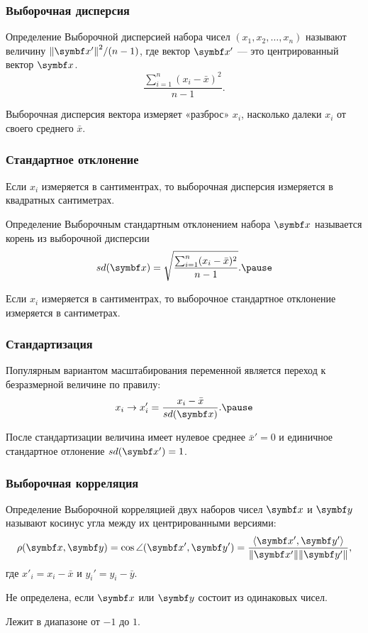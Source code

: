 \begin{frame}
  \frametitle{Выборочная дисперсия}

  \begin{block}{Определение}
    \alert{Выборочной дисперсией} набора чисел $(x_1, x_2, \ldots, x_n)$ 
    называют величину $\norm{\bx'}^2 / (n-1)$, где вектор $\bx'$ — это 
    центрированный вектор $\bx$. 
    \[
    \frac{\sum_{i=1}^n(x_i - \bar x)^2}{n-1}.  
    \]
    \pause
  \end{block}

  Выборочная дисперсия вектора измеряет «разброс» $x_i$, 
  насколько далеки $x_i$ от своего среднего $\bar x$.
  

\end{frame}


\begin{frame}
  \frametitle{Стандартное отклонение}

  Если $x_i$ измеряется в сантиментрах, 
  то выборочная дисперсия измеряется в квадратных сантиметрах. \pause

  \begin{block}{Определение}
    \alert{Выборочным стандартным отклонением} набора $\bx$ называется 
    корень из выборочной дисперсии 
    \[
      sd(\bx) = \sqrt{\frac{\sum_{i=1}^n(x_i - \bar x)^2}{n-1}}. \pause
    \]
  \end{block}

  \pause 
  Если $x_i$ измеряется в сантиментрах, 
  то выборочное стандартное отклонение измеряется в  сантиметрах. 
  

\end{frame}

\begin{frame}
  \frametitle{Стандартизация}

  Популярным вариантом масштабирования переменной является переход к безразмерной 
  величине по правилу:
  \[
  x_i  \to x_i' =  \frac{x_i - \bar x}{sd(\bx)}.  \pause
  \]

  После стандартизации величина имеет нулевое среднее $\bar x' =0$ и 
  единичное стандартное отлонение $sd(\bx') = 1$.


\end{frame}


\begin{frame}
  \frametitle{Выборочная корреляция}

  \begin{block}{Определение}
    \alert{Выборочной корреляцией} двух наборов чисел $\bx$ и $\by$
    называют косинус угла между их центрированными версиями:
    \[
    \rho(\bx, \by) = \cos \angle (\bx', \by') = \frac{\langle \bx', \by' \rangle}{\norm{\bx'} \norm{\by'}},   
    \]
    где $x'_i = x_i - \bar x$ и $y_i' = y_i - \bar y$. \pause
  \end{block}

Не определена, если $\bx$ или $\by$ состоит из одинаковых чисел. \pause
 
Лежит в диапазоне от $-1$ до $1$. 

\end{frame}


